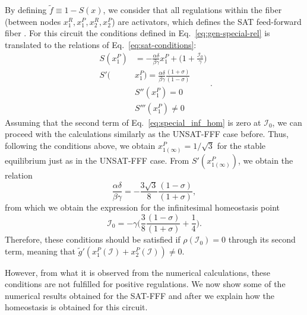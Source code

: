 By defining $\tilde{f} \equiv 1 - S(x)$, we consider that all regulations within the fiber 
(between nodes $x_1^R, x_1^P, x_2^R, x_2^P$) are activators, which defines the 
SAT feed-forward fiber \cite{transistor2019}. For this circuit the conditions 
defined in Eq.~\ref{eq:gen-special-rel} is translated to the relations of
Eq.~\ref{eq:sat-conditions}: 
\begin{equation} \label{eq:sat-conditions}
    \begin{aligned} S(x_1^P) &= -\frac{\alpha \delta}{\beta \gamma}x_1^P + \big(1+ \frac{\mathcal{I}_0}{\gamma}\big) \\ 
        S'(&x_1^P) = \frac{\alpha\delta}{\beta\gamma}\frac{(1+\sigma)}{(1-\sigma)} \\ 
        &S''(x_1^P) = 0 \\ 
        &S'''(x_1^P) \neq 0  
    \end{aligned}.
\end{equation}
Assuming that the second term of Eq.~\ref{eq:special_inf_hom} is zero at $\mathcal{I}_0$, 
we can proceed with the calculations similarly as the UNSAT-FFF case before. Thus, 
following the conditions above, we obtain $x_{1(\infty)}^P = 1/\sqrt{3}$ for the stable 
equilibrium just as in the UNSAT-FFF case. From $S'(x_{1(\infty)}^P)$, we obtain the relation
\begin{equation}
    \frac{\alpha \delta}{\beta \gamma} = - \frac{3\sqrt{3}}{8}\frac{(1-\sigma)}{(1+\sigma)},
\end{equation} 
from which we obtain the expression for the infinitesimal homeostasis point
\begin{equation}
        \mathcal{I}_0 = -\gamma\bigg(\frac{3}{8}\frac{(1-\sigma)}{(1+\sigma)} + \frac{1}{4}\bigg).  
\end{equation}
Therefore, these conditions should be satisfied if $\rho(\mathcal{I}_0) = 0$ through its second 
term, meaning that $\tilde{g}'(x_1^P(\mathcal{I}) + x_2^P(\mathcal{I})) \neq 0$.

However, from what it is observed from the numerical calculations, these conditions are 
not fulfilled for positive regulations. We now show some of the numerical results obtained for the SAT-FFF and 
after we explain how the homeostasis is obtained for this circuit.

